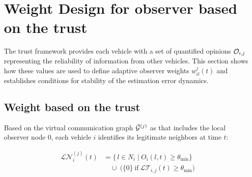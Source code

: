 \section{Weight Design for observer based on the trust}\label{sec_Weigth_Design}
The trust framework provides each vehicle with a set of quantified opinions $\mathcal{O}_{i,j}$ representing the reliability of information from other vehicles.
This section shows how these values are used to define adaptive observer weights $w_{il}^{j}(t)$ and establishes conditions for stability of the estimation error dynamics.

\subsection{Weight based on the trust}
Based on the virtual communication graph $\bar{\mathcal{G}}^{{(j)}}$ as that includes the local observer node 0, each vehicle $i$ identifies its legitimate neighbors at time $t$: 



\begin{align}
\mathcal{LN}^{(j)}_{i}(t)
&= \Big\{\, l \in N_i \;\big|\; O_i(l,t) \ge \theta_{\min} \Big\} \nonumber \\
&\quad \cup\;
\Big( \{0\}\ \text{if}\ \mathcal{LT}_{i,j}(t) \ge \theta_{\min} \Big)
\end{align}


